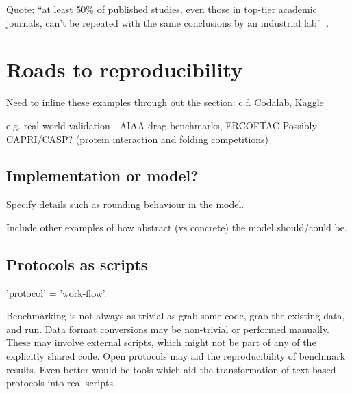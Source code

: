 \documentclass[conference]{IEEEtran}
\begin{document}
Quote: ``at least 50\% of published studies, even those in top-tier
academic journals, can't be repeated with the same conclusions by an
industrial lab''~\cite{osherovich:2011}.



\section{Roads to reproducibility}


Need to inline these examples through out the section: 
	c.f. Codalab, Kaggle

	e.g. real-world validation - AIAA drag benchmarks, ERCOFTAC
	Possibly CAPRI/CASP? (protein interaction and folding competitions)


\subsection{Implementation or model?}

Specify details such as rounding behaviour in the model.

Include other examples of how abstract (vs concrete) the model should/could be. 




\subsection{Protocols as scripts}


'protocol' = 'work-flow'. 

Benchmarking is not always as trivial as grab some code, grab the 
existing data, and run. Data format conversions may be non-trivial
or performed manually. These may involve external scripts, which 
might not be part of any of the explicitly shared code. Open 
protocols may aid the reproducibility of benchmark results. Even 
better would be tools which aid the transformation of text based
protocols into real scripts.
\end{document}
